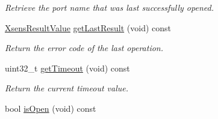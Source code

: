 \begin{DoxyCompactItemize}
\begin{DoxyCompactList}\small\item\em \-Retrieve the port name that was last successfully opened. \end{DoxyCompactList}\item 
\hypertarget{classxsens_1_1Cmt1s_adc840277d1cba00826d56259d7b167c1}{\hyperlink{group__enums_ga822a2260a20af524029eef9e9a51ff6f}{\-Xsens\-Result\-Value} \hyperlink{classxsens_1_1Cmt1s_adc840277d1cba00826d56259d7b167c1}{get\-Last\-Result} (void) const }\label{classxsens_1_1Cmt1s_adc840277d1cba00826d56259d7b167c1}

\begin{DoxyCompactList}\small\item\em \-Return the error code of the last operation. \end{DoxyCompactList}\item 
\hypertarget{classxsens_1_1Cmt1s_abbfd628c82cd70bf26b04a524e586f2a}{uint32\-\_\-t \hyperlink{classxsens_1_1Cmt1s_abbfd628c82cd70bf26b04a524e586f2a}{get\-Timeout} (void) const }\label{classxsens_1_1Cmt1s_abbfd628c82cd70bf26b04a524e586f2a}

\begin{DoxyCompactList}\small\item\em \-Return the current timeout value. \end{DoxyCompactList}\item 
\hypertarget{classxsens_1_1Cmt1s_aaabbf7258cfaca82a1df9da8e9b796d6}{bool \hyperlink{classxsens_1_1Cmt1s_aaabbf7258cfaca82a1df9da8e9b796d6}{is\-Open} (void) const }\label{classxsens_1_1Cmt1s_aaabbf7258cfaca82a1df9da8e9b796d6}


\end{DoxyCompactItemize}
